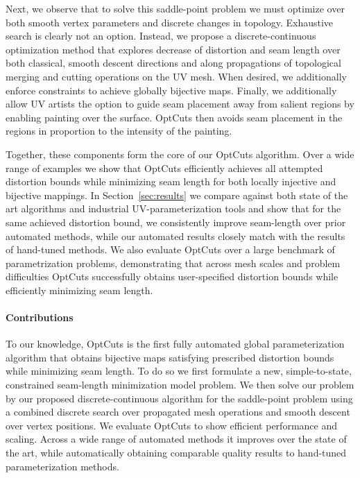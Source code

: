   Next, we observe that to solve this saddle-point problem we must optimize over both smooth vertex parameters and discrete changes in topology. Exhaustive search is clearly not an option. Instead, we propose a discrete-continuous optimization method that explores decrease of distortion and seam length over both classical, smooth descent directions and along propagations of topological merging and cutting operations on the UV mesh. When desired, we additionally enforce constraints to achieve globally bijective maps. Finally, we additionally allow UV artists the option to guide seam placement away from salient regions by enabling painting over the surface. OptCuts then avoids seam placement in the regions in proportion to the intensity of the painting.
  
  Together, these components form the core of our OptCuts algorithm. Over a wide range of examples we show that OptCuts efficiently achieves all attempted distortion bounds while minimizing seam length for both locally injective and bijective mappings. In Section~\ref{sec:results} we compare against both state of the art algorithms and industrial UV-parameterization tools and show that for the same achieved distortion bound, we consistently improve seam-length over prior automated methods, while our automated results closely match with the results of hand-tuned methods. We also evaluate OptCuts over a large benchmark of parametrization problems, demonstrating that across mesh scales and problem difficulties OptCuts successfully obtains user-specified distortion bounds while efficiently minimizing seam length. 
  
\paragraph{Contributions}

To our knowledge, OptCuts is the first fully automated global parameterization algorithm that obtains bijective maps satisfying prescribed distortion bounds while minimizing seam length. To do so we first formulate a new, simple-to-state, constrained seam-length minimization model problem. We then solve our problem by our proposed discrete-continuous algorithm for the saddle-point problem using a combined discrete search over propagated mesh operations and smooth descent over vertex positions. We evaluate OptCuts to show efficient performance and scaling. Across a wide range of automated methods it improves over the state of the art, while automatically obtaining comparable quality results to hand-tuned parameterization methods. 
